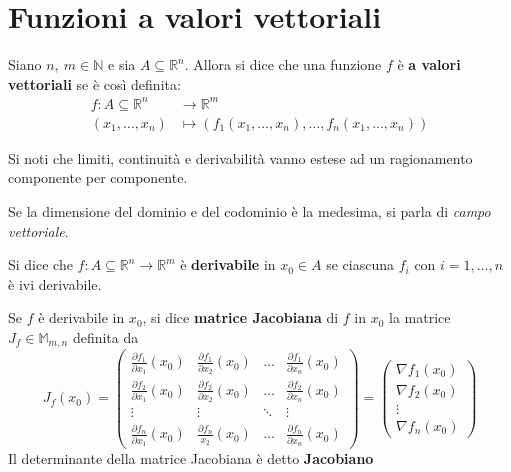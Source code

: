 \section{Funzioni a valori vettoriali}
\begin{definition} \label{Def: Funzioni a valori vettoriali}
    Siano $n,\ m \in \mathbb{N}$ e sia $A \subseteq \mathbb{R}^n$. Allora si dice che una funzione $f$ è \textbf{a valori vettoriali} se è così definita:
    \begin{equation}
    \begin{aligned}
        f:A \subseteq \mathbb{R}^n &\to \mathbb{R}^m\\
        (x_1, \dots, x_n) &\mapsto (f_1(x_1, \dots, x_n), \dots, f_n(x_1, \dots, x_n))
    \end{aligned}
    \end{equation}
\end{definition}
\begin{oss}
    Si noti che limiti, continuità e derivabilità vanno estese ad un ragionamento componente per componente.
\end{oss}
\begin{oss}
    Se la dimensione del dominio e del codominio è la medesima, si parla di \textit{campo vettoriale}.
\end{oss}
\begin{definition} \label{Def: Derivabilità di f. vettoriali}
    Si dice che $f:A \subseteq \mathbb{R}^n \to \mathbb{R}^m$ è \textbf{derivabile} in $x_0 \in A$ se ciascuna $f_i$ con $i=1, \dots, n$ è ivi derivabile.
\end{definition}
\begin{definition} \label{Def: Matrice Jacobiana}
    Se $f$ è derivabile in $x_0$, si dice \textbf{matrice Jacobiana} di $f$ in $x_0$ la matrice $J_f \in \mathbb{M}_{m,n}$ definita da
    \begin{equation} \label{Eq: Matrice Jacobiana}
        J_f(x_0)=\begin{pmatrix}
            \frac{\partial{f_1}}{\partial{x_1}}(x_0) & \frac{\partial{f_1}}{\partial{x_2}}(x_0)& \dots & \frac{\partial{f_1}}{\partial{x_n}}(x_0)\\
            \frac{\partial{f_2}}{\partial{x_1}}(x_0)& \frac{\partial{f_2}}{\partial{x_2}}(x_0)& \dots & \frac{\partial{f_2}}{\partial{x_n}}(x_0)\\
            \vdots & \vdots & \ddots & \vdots\\
            \frac{\partial{f_n}}{\partial{x_1}}(x_0) & \frac{\partial{f_n}}{x_2}(x_0)& \dots & \frac{\partial{f_n}}{\partial{x_n}}(x_0)
        \end{pmatrix}
        =
        \begin{pmatrix}
            \nabla f_1 (x_0)\\
            \nabla f_2(x_0)\\
            \vdots\\
            \nabla f_n(x_0)
        \end{pmatrix}
    \end{equation}
    Il determinante della matrice Jacobiana è detto \textbf{Jacobiano} \label{Def: Jacobiano}
\end{definition}
